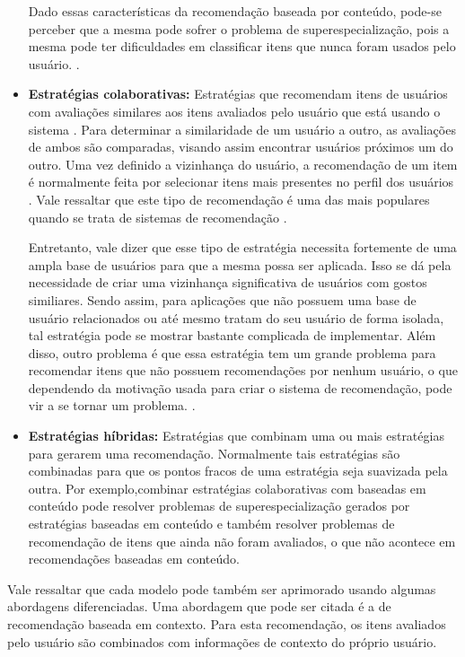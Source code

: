 \begin{itemize}
        Dado essas características da recomendação baseada por conteúdo, pode-se
        perceber que a mesma pode sofrer o problema de superespecialização, pois
        a mesma pode ter dificuldades em classificar itens que nunca foram
        usados pelo usuário. \cite{lops2011content}.

    \item \textbf{Estratégias colaborativas:} Estratégias que recomendam itens
        de usuários com avaliações similares aos itens avaliados pelo usuário
        que está usando o sistema \cite{schafer2007collaborative}.
        Para determinar a similaridade de um usuário a outro, as avaliações de
        ambos são comparadas, visando assim encontrar usuários próximos um do
        outro. Uma vez definido a vizinhança do usuário, a recomendação de um
        item é normalmente feita por selecionar itens mais presentes no perfil
        dos usuários \cite{araujo2011apprecommender}. Vale ressaltar que este tipo de recomendação é uma das mais
        populares quando se trata de sistemas de recomendação
        \cite{ricci2011introduction}.

        Entretanto, vale dizer que esse tipo de estratégia necessita fortemente
        de uma ampla base de usuários para que a mesma possa ser aplicada. Isso
        se dá pela necessidade de criar uma vizinhança significativa de usuários
        com gostos similiares. Sendo assim, para aplicações que não possuem uma
        base de usuário relacionados ou até mesmo tratam do seu usuário de forma
        isolada, tal estratégia pode se mostrar bastante complicada de
        implementar. Além disso, outro problema é que essa estratégia tem um
        grande problema para recomendar itens que não possuem recomendações por
        nenhum usuário, o que dependendo da motivação usada para criar o sistema
        de recomendação, pode vir a se tornar um problema.
        \cite{ricci2011introduction}.


    \item \textbf{Estratégias híbridas: } Estratégias que combinam uma ou mais
        estratégias para gerarem uma recomendação. Normalmente tais estratégias
        são combinadas para que os pontos fracos de uma estratégia seja
        suavizada pela outra. Por exemplo,combinar estratégias colaborativas com
        baseadas em conteúdo pode resolver problemas de superespecialização
        gerados por estratégias baseadas em conteúdo e também resolver problemas
        de recomendação de itens que ainda não foram avaliados, o que não
        acontece em recomendações baseadas em conteúdo. 

\end{itemize}

Vale ressaltar que cada modelo pode também ser aprimorado usando algumas
abordagens diferenciadas. Uma abordagem que pode ser citada é a de recomendação
baseada em contexto. Para esta recomendação, os itens avaliados pelo usuário são
combinados com informações de contexto do próprio usuário. 


